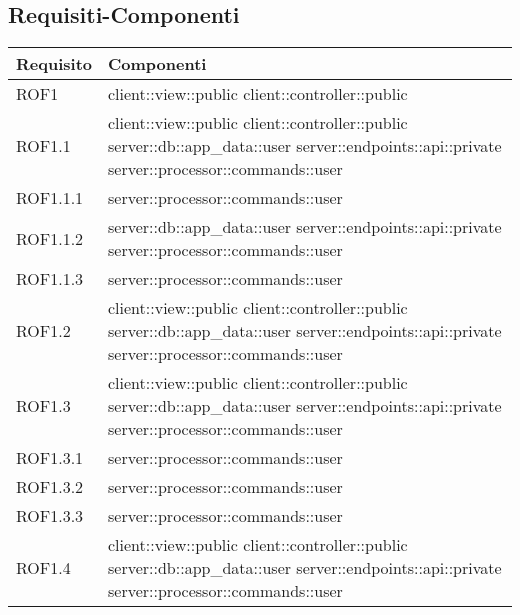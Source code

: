 \subsection{Requisiti-Componenti} %
\label{sub:componenti_requisiti}
\begin{center}
\def\arraystretch{1.5}
\bgroup
\begin{longtable}{| p{4cm} | p{8cm} |}
\hline
\textbf{Requisito} & \textbf{Componenti} \\
\hline
ROF1 & client::view::public \newline client::controller::public \\
\hline
ROF1.1 & client::view::public \newline client::controller::public \newline server::db::app\_data::user \newline server::endpoints::api::private \newline server::processor::commands::user \\
\hline
ROF1.1.1 & server::processor::commands::user \\
\hline
ROF1.1.2 & server::db::app\_data::user \newline server::endpoints::api::private \newline server::processor::commands::user \\
\hline
ROF1.1.3 & server::processor::commands::user \\
\hline
ROF1.2 & client::view::public \newline client::controller::public \newline server::db::app\_data::user \newline server::endpoints::api::private \newline server::processor::commands::user \\
\hline
ROF1.3 & client::view::public \newline client::controller::public \newline server::db::app\_data::user \newline server::endpoints::api::private \newline server::processor::commands::user \\
\hline
ROF1.3.1 & server::processor::commands::user \\
\hline
ROF1.3.2 & server::processor::commands::user \\
\hline
ROF1.3.3 & server::processor::commands::user \\
\hline
ROF1.4 & client::view::public \newline client::controller::public \newline server::db::app\_data::user \newline server::endpoints::api::private \newline server::processor::commands::user \\

\end{longtable}
\end{center}
